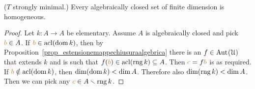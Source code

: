 \begin{proposition}\label{prop_zilbergiocattolo}
  ($T$ strongly minimal.)
  Every algebraically closed set of finite dimension is homogeneous.
\end{proposition}
\begin{proof}
  Let $k:A\to A$ be elementary.
  Assume $A$ is algebraically closed and pick ${\color{brown} b}\in A$.
  If ${\color{brown} b}\in{\rm acl}(\mathop{\rm dom} k)$, then by Proposition~\ref{prop_estensionemappechiusuraalgebrica} there is an $f\in{\rm Aut\kern.15ex}(\EuScript U)$ that extends $k$ and is such that $f({\color{brown} b})\in{\rm acl}(\mathop{\rm rng} k)\subseteq A$.
  Then ${\color{brown} c}=f{\color{brown} b}$ is as required.
  If ${\color{brown} b}\notin{\rm acl}(\mathop{\rm dom} k)$, then $\dim(\mathop{\rm dom} k)<\dim A$.
  Therefore also  $\dim(\mathop{\rm rng} k)<\dim A$.
  Then we can pick any ${\color{brown} c}\in A\smallsetminus\mathop{\rm rng} k$.
\end{proof}

